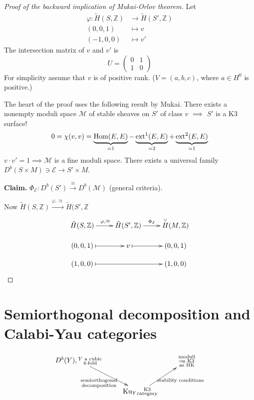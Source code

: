 \begin{proof}[Proof of the backward implication of Mukai-Orlov theorem]
Let 
\begin{align*}
\varphi: \tilde{H}(S,\mathbb{Z}) &\longrightarrow \tilde{H}(S',\mathbb{Z}) \\
(0,0,1) &\longmapsto v\\
(-1,0,0) &\longmapsto v'
\end{align*}
The intersection matrix of $v$ and $v'$ is
$$
U=\begin{pmatrix}
0&1\\ 
1&0
\end{pmatrix}
$$
For simplicity assume that $v$ is of positive rank. ($V=(a,b,c)$, where $a\in
H^0$ is positive.)

The heart of the proof uses the following result by Mukai. There exists a
nonempty moduli space $\mathcal{M}$ of stable sheaves on $S'$ of class $v$
$\implies$ $S'$ is a K3 surface!
$$
0=\chi(v,v)=\underbrace{\mathop{\mathrm{Hom}}\nolimits(E,E)}_{=1}-\underbrace{\text{ext}^1(E,E)}_{=2}
+\underbrace{\text{ext}^2(E,E)}_{=1}
$$
$v\cdot v'=1\implies \mathcal{M}$ is a fine moduli space. There exists a
universal family $D^b(S \times M)\ni \mathcal{E} \to S' \times M$.

{\bf Claim.} $\Phi_{\mathcal{E}}:D^b(S')\xrightarrow{\cong} D^b(\mathcal{M})$
(general criteria).

Now $\tilde{H}(S,\mathbb{Z})\xrightarrow{\varphi,\cong} \tilde{H}(S',\mathbb{Z}$
$$
\xymatrixrowsep{1em}
\xymatrix{
\tilde{H}(S,\mathbb{Z})\ar[r]^{\varphi,\cong}&\tilde{H}(S',\mathbb{Z})
\ar[r]^{\Phi_{\mathcal{E}}}&\overset{\vee}{H}(M,\mathbb{Z})\\
(0,0,1)\ar@{|->}[r]&  v \ar@{|->}[r]& (0,0,1)\\
(1,0,0)\ar@{|->}[rr]& & (1,0,0)
}
$$
\end{proof}

\section{Semiorthogonal decomposition and Calabi-Yau categories}
\label{section-SOD-and-CY-categories}

\begin{situation}
\label{situation-SOD-and-SC}
$$
\xymatrix{
D^b(Y),\substack{Y\text{ a cubic} \\
\text{4-fold}}\ar[dr]_{\substack{\text{semiorthogonal} \\
\text{decomposition}}}
&  &\substack{\text{moduli}\\ \text{on K3} \\ \text{as HK}}\\
&\text{Ku}_Y\substack{\text{K3} \\ \text{category}}
\ar[ur]_{\text{stability conditions}}
}
$$
\end{situation}

